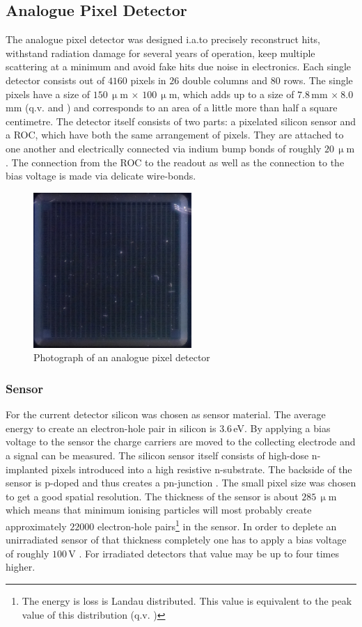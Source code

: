 \documentclass[british,11pt,a4paper]{memoir}
\begin{document}
\subsection{Analogue Pixel Detector}\label{s130}
The analogue pixel detector was designed i.a.to precisely reconstruct hits, withstand radiation damage for several years of operation, keep multiple scattering at a minimum and avoid fake hits due noise in electronics. Each single detector consists out of $4160$ pixels in $26$ double columns and $80$ rows. The single pixels have a size of $150\,\upmu$m $\times$ $100\,\upmu$m, which adds up to a size of $7.8\,$mm $\times\ 8.0\,$mm (q.v.  and ) and corresponds to an area of a little more than half a square centimetre. The detector itself consists of two parts: a pixelated silicon sensor and a \ac{ROC}, which have both the same arrangement of pixels. They are attached to one another and electrically connected via indium bump bonds of roughly $20\,\upmu$m \cite{kaestli}. The connection from the \ac{ROC} to the readout as well as the connection to the bias voltage is made via delicate wire-bonds.
\begin{figure}[ht]
	\centering
	\includegraphics[width=6cm]{ROC0}
	\caption{Photograph of an analogue pixel detector}
	\label{p24}
\end{figure}
\subsubsection{Sensor}\label{s220}
For the current detector silicon was chosen as sensor material. The average energy to create an electron-hole pair in silicon is $3.6\,$eV. By applying a bias voltage to the sensor the charge carriers are moved to the collecting electrode and a signal can be measured. The silicon sensor itself consists of high-dose n-implanted pixels introduced into a high resistive n-substrate. The backside of the sensor is p-doped and thus creates a pn-junction \cite{allkofer}. The small pixel size was chosen to get a good spatial resolution. The thickness of the sensor is about $285\,\upmu$m which means that minimum ionising particles will most probably create approximately $22000$ electron-hole pairs\footnote{The energy is loss is Landau distributed. This value is equivalent to the peak value of this distribution (q.v. )} in the sensor. In order to deplete an unirradiated sensor of that thickness completely one has to apply a bias voltage of roughly $100\,$V \cite{pixadd}. For irradiated detectors that value may be up to four times higher.
\end{document}
